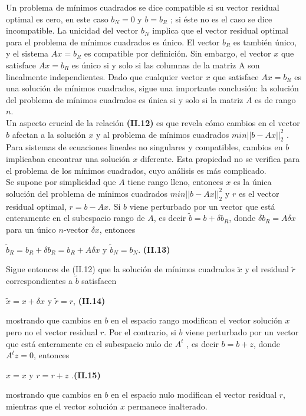 \documentclass[twocolumn,twoside]{article}
\begin{document}
Un problema de m\'inimos cuadrados se dice compatible si su vector residual optimal es
cero, en este caso $b_N = 0$ y $b = b_R$ ; si \'este no es el caso se dice incompatible.
La unicidad del vector $b_N$ implica que el vector residual optimal para el problema
de m\'inimos cuadrados es \'unico. El vector $b_R$ es tambi\'en \'unico, y el sistema $A x = b_R$
es compatible por definici\'on. Sin embargo, el vector $x$ que satisface $A x = b_R$ es \'unico si
y solo si las columnas de la matriz A son linealmente independientes. Dado que cualquier
vector $x$ que satisface $A x = b_R$ es una soluci\'on de m\'inimos cuadrados, sigue una
importante conclusi\'on: la soluci\'on del problema de m\'inimos cuadrados es \'unica
si y solo si la matriz $A$ es de rango $n$.\\
Un aspecto crucial de la relaci\'on \textbf{(II.12)} es que revela c\'omo cambios en el vector
$b$ afectan a la soluci\'on $x$ y al problema de m\'inimos cuadrados $min ||b - A x||_2^2$ . Para
sistemas de ecuaciones lineales no singulares y compatibles, cambios en $b$ implicaban
encontrar una soluci\'on $x$ diferente. Esta propiedad no se verifica para el problema de los
m\'inimos cuadrados, cuyo an\'alisis es m\'as complicado.\\
Se supone por simplicidad que $A$ tiene rango lleno, entonces $x$ es la \'unica soluci\'on
del problema de m\'inimos cuadrados $min ||b - A x||_2^2$ y $r$ es el vector residual optimal,
$r = b - A x$. Si $b$ viene perturbado por un vector que est\'a enteramente en el subespacio
rango de $A$, es decir  $\tilde{b}  = b + \delta b_R $, donde $\delta b_R = A \delta x$ para un \'unico $n$-vector $\delta x$, entonces
\begin{center}
  $ \tilde{b}_R = b_R + \delta b_R = b_R + A\delta x $ y $ \tilde{b}_N = b_N $. \textbf{(II.13)}
\end{center}
Sigue entonces de (II.12) que la soluci\'on de m\'inimos cuadrados $\tilde{x}$ y el residual $\tilde{r}$
correspondientes a $\tilde{b}$ satisfacen
\begin{center}
  $\tilde{x}= x + \delta x$ y $\tilde{r}= r$, \hspace{0.5cm}\textbf{(II.14)}
\end{center}

mostrando que cambios en $b$ en el espacio rango modifican el vector soluci\'on $x$ pero
no el vector residual $r$. Por el contrario, si $b$ viene perturbado por un vector que est\'a
enteramente en el subespacio nulo de $A^t$ , es decir $b = b + z$, donde $A^t z = 0$, entonces
\begin{center}
  $x = x$ y $r = r + z$ .\hspace{1.5cm}\textbf{(II.15)}
\end{center}
mostrando que cambios en $b$ en el espacio nulo modifican el vector residual $r$, mientras
que el vector soluci\'on $x$ permanece inalterado.
\end{document}
